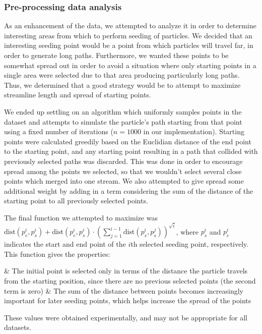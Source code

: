 \documentclass{article}
\begin{document}
\subsubsection*{Pre-processing data analysis}
\label{sec:prepro}

As an enhancement of the data, we attempted to analyze it in order to determine interesting areas from which to perform seeding of particles. We decided that an interesting seeding point would be a point from which particles will travel far, in order to generate long paths. Furthermore, we wanted these points to be somewhat spread out in order to avoid a situation where only starting points in a single area were selected due to that area producing particularly long paths. Thus, we determined that a good strategy would be to attempt to maximize streamline length and spread of starting points.

We ended up settling on an algorithm which uniformly samples points in the dataset and attempts to simulate the particle's path starting from that point using a fixed number of iterations ($n = 1000$ in our implementation). Starting points were calculated greedily based on the Euclidian distance of the end point to the starting point, and any starting point resulting in a path that collided with previously selected paths was discarded. This was done in order to encourage spread among the points we selected, so that we wouldn't select several close points which merged into one stream. We also attempted to give spread some additional weight by adding in a term considering the sum of the distance of the starting point to all previously selected points.

The final function we attempted to maximize was $\textrm{dist}(p_e^i, p_s^i) + \textrm{dist}(p_e^i, p_s^i)\cdot(\sum_{j=1}^{i-1}{\textrm{dist}(p_s^i, p_s^j)})^{\sqrt{i}}$, where $p_s^i$ and $p_e^i$ indicates the start and end point of the $i$th selected seeding point, respectively. This function gives the properties:
\begin{easylist}[itemize]
& The initial point is selected only in terms of the distance the particle travels from the starting position, since there are no previous selected points (the second term is zero)
& The sum of the distance between points becomes increasingly important for later seeding points, which helps increase the spread of the points
\end{easylist}

These values were obtained experimentally, and may not be appropriate for all datasets.
\end{document}
